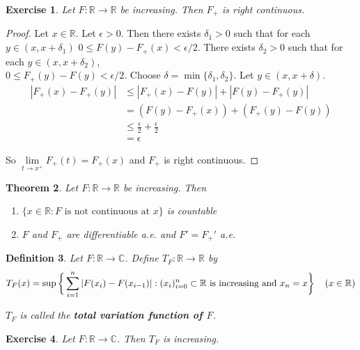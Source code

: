 \documentclass[12pt]{amsart}
\newtheorem{thm}{Theorem}[section]
\newtheorem{defn}[thm]{Definition}
\newtheorem{ex}[thm]{Exercise}
\newcommand{\del}{\delta}
\newcommand{\ep}{\epsilon}
\newcommand{\C}{\mathbb{C}}
\newcommand{\R}{\mathbb{R}}
\begin{document}
\begin{ex}
Let $F:\R \rightarrow \R$ be increasing. Then $F_+$ is right continuous. 
\end{ex}

\begin{proof}
Let $x \in \R$. Let $\ep >0$. Then there exists $\del_1>0$ such that for each $y \in (x,x+\del_1)$ $0 \leq F(y)-F_+(x) < \ep/2$. There exists $\del_2 >0$ such that for each $y \in (x,x+\del_2)$, \\$0 \leq F_+(y)-F(y) < \ep/2$. Choose $\del = \min\{\del_1, \del_2\}$. Let $y \in (x, x+\del)$.
\begin{align*}
|F_+(x) - F_+(y)|
& \leq |F_+(x) - F(y)| + |F(y)- F_+(y)| \\
& = (F(y) - F_+(x)) + (F_+(y) - F(y)) \\
& \leq \frac{\ep}{2} + \frac{\ep}{2}\\
& = \ep
\end{align*}

So $\lim\limits_{t \rightarrow x^+} F_+(t) = F_+(x)$ and $F_+$ is right continuous.
\end{proof}

\begin{thm}
Let $F:\R \rightarrow \R$ be increasing. Then 
\begin{enumerate}
\item $\{x \in \R: F \text{ is not continuous at }x\}$ is countable
\item $F$ and $F_+$ are differentiable a.e. and $F' = F_+'$ a.e.
\end{enumerate}
\end{thm}

\begin{defn}
Let $F:\R \rightarrow \C$. Define $T_F:\R \rightarrow \R$ by $$T_F(x) = \sup\bigg \{\sum_{i=1}^{n}|F(x_{i}) - F(x_{i-1})|: (x_i)_{i=0}^n \subset \R \text{ is increasing and } x_n=x  \bigg \} \hspace{4mm} (x \in \R)$$

$T_F$ is called the \textbf{total variation function of $F$}.
\end{defn}

\begin{ex}
Let $F:\R \rightarrow \C$. Then $T_F$ is increasing.
\end{ex}
\end{document}
